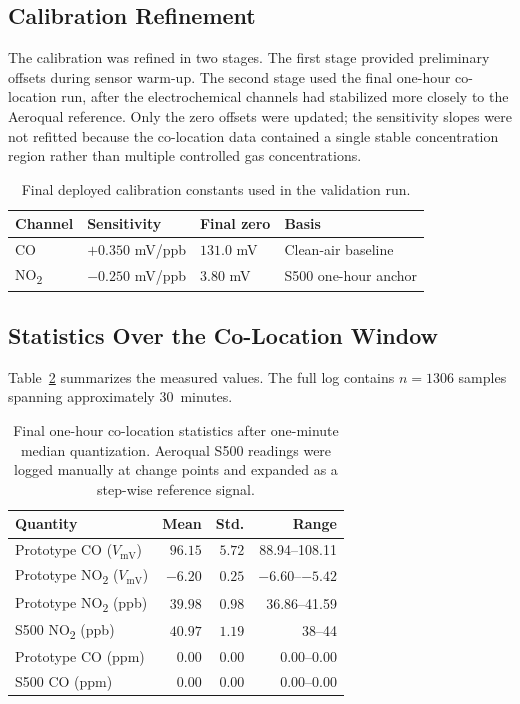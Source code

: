 \documentclass[conference]{IEEEtran}
\begin{document}
\subsection{Calibration Refinement}
The calibration was refined in two stages. The first stage provided preliminary offsets during sensor warm-up. The second stage used the final one-hour co-location run, after the electrochemical channels had stabilized more closely to the Aeroqual reference. Only the zero offsets were updated; the sensitivity slopes were not refitted because the co-location data contained a single stable concentration region rather than multiple controlled gas concentrations.

\begin{table}[t]
\centering
\caption{Final deployed calibration constants used in the validation run.}
\label{tab:final_calibration}
\scriptsize
\begin{tabular}{@{}llll@{}}
\toprule
Channel & Sensitivity & Final zero & Basis \\
\midrule
CO & $+0.350$ mV/ppb & $131.0$ mV & Clean-air baseline \\
NO\textsubscript{2} & $-0.250$ mV/ppb & $3.80$ mV & S500 one-hour anchor \\
\bottomrule
\end{tabular}
\end{table}

\subsection{Statistics Over the Co-Location Window}
Table~\ref{tab:colocstats} summarizes the measured values. The full log contains $n=1306$ samples spanning approximately 30~minutes.

\begin{table}[t]
\centering
\caption{Final one-hour co-location statistics after one-minute median quantization. Aeroqual S500 readings were logged manually at change points and expanded as a step-wise reference signal.}
\label{tab:colocstats}
\scriptsize
\setlength{\tabcolsep}{3pt}
\renewcommand{\arraystretch}{0.95}
\begin{tabular}{@{}p{}rrr@{}}
\toprule
Quantity & Mean & Std. & Range \\
\midrule
Prototype CO ($V_{\text{mV}}$) & $96.15$ & $5.72$ & 88.94--108.11 \\
Prototype NO\textsubscript{2} ($V_{\text{mV}}$) & $-6.20$ & $0.25$ & $-6.60$--$-5.42$ \\
Prototype NO\textsubscript{2} (ppb) & $39.98$ & $0.98$ & 36.86--41.59 \\
S500 NO\textsubscript{2} (ppb) & $40.97$ & $1.19$ & 38--44 \\
Prototype CO (ppm) & $0.00$ & $0.00$ & 0.00--0.00 \\
S500 CO (ppm) & $0.00$ & $0.00$ & 0.00--0.00 \\
\bottomrule
\end{tabular}
\end{table}
\end{document}
